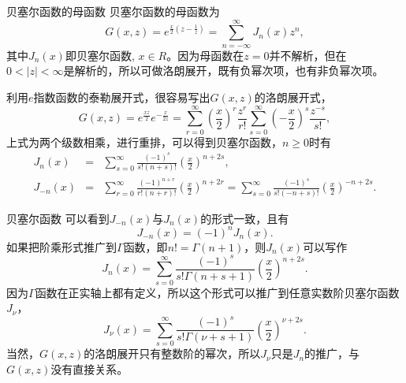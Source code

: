 \documentclass[11pt]{beamer}
\begin{document}
\begin{frame}{贝塞尔函数的母函数}
贝塞尔函数的母函数为
\begin{equation}
G(x,z) = e^{\frac{x}{2}(z-\frac{1}{z})} = \sum^\infty_{n=-\infty} J_n(x) z^n,
\end{equation}
其中$J_n(x)$即贝塞尔函数, $x \in R$。因为母函数在$z=0$并不解析，但在$0<|z|<\infty$是解析的，所以可做洛朗展开，既有负幂次项，也有非负幂次项。

利用$e$指数函数的泰勒展开式，很容易写出$G(x,z)$的洛朗展开式，
\begin{equation}
G(x,z) = e^{\frac{xz}{2}} e^{-\frac{x}{2z}}
= \sum^\infty_{r=0} (\frac{x}{2})^r \frac{z^r}{r!}
\sum^\infty_{s=0} (-\frac{x}{2})^s \frac{z^{-s}}{s!},
\end{equation}
上式为两个级数相乘，进行重排，可以得到贝塞尔函数，$n \geq 0$时有
\begin{eqnarray}
J_n(x) &=& \sum^\infty_{s=0} \frac{(-1)^s}{s!(n+s)!}(\frac{x}{2})^{n+2s}, \\
J_{-n}(x) &=& \sum^\infty_{r=0}
\frac{(-1)^{n+r}}{r!(n+r)!}(\frac{x}{2})^{n+2r}
=\sum^\infty_{s=0} \frac{(-1)^s}{s!(-n+s)!}(\frac{x}{2})^{-n+2s}.
\end{eqnarray}
\end{frame}

\begin{frame}{贝塞尔函数}
可以看到$J_{-n}(x)$与$J_n(x)$的形式一致，且有
\begin{equation}
J_{-n}(x) = (-1)^n J_n(x).
\end{equation}
如果把阶乘形式推广到$\Gamma$函数，即$n! = \Gamma(n+1)$，则$J_n(x)$可以写作
\begin{equation}
J_n(x) = \sum^\infty_{s=0} \frac{(-1)^s}{s!\Gamma(n+s+1)} (\frac{x}{2})^{n+2s}.
\end{equation}
因为$\Gamma$函数在正实轴上都有定义，所以这个形式可以推广到任意实数阶贝塞尔函数$J_\nu$，
\begin{equation}
J_\nu(x) = \sum^\infty_{s=0} \frac{(-1)^s}{s!\Gamma(\nu+s+1)} (\frac{x}{2})^{\nu+2s}.
\end{equation}
当然，$G(x,z)$的洛朗展开只有整数阶的幂次，所以$J_\nu$只是$J_n$的推广，与$G(x,z)$没有直接关系。
\end{frame}
\end{document}

